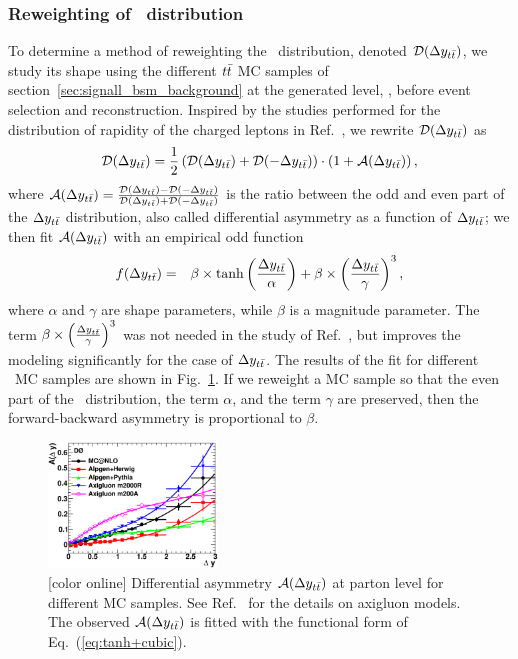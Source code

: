 \documentclass[aps,prd,twocolumn,showpacs,superscriptaddress,groupedaddress,floatfix]{revtex4}
\begin{document}
\subsubsection{Reweighting of \dyttbar\ distribution}
\label{subsec:rewFunction_dy}
To determine a method of reweighting the \dyttbar\ distribution,
denoted ${\cal D}(\Delta y_{t\bar{t}}) $,
we study
its shape using the different $t\bar{t}$ MC samples of
section~\ref{sec:signall_bsm_background}
at the generated level, \ie, before event selection and reconstruction.
Inspired by the studies performed for the distribution of rapidity of the charged leptons in  Ref.~\cite{AFB_form_discussion},
we rewrite ${\cal D}(\Delta y_{t\bar{t}}) $ as
\begin{equation}
 {\cal D}(\Delta y_{t\bar{t}})=\frac 1 2 \left( {\cal D}(\Delta y_{t\bar{t}})+ {\cal D}(-\Delta y_{t\bar{t}})\right)\cdot \left(1+   {\cal A}(\Delta y_{t\bar{t}}) \right),
\end{equation}
where ${\cal A}(\Delta y_{t\bar{t}})=\frac{ {\cal D}(\Delta y_{t\bar{t}})- {\cal D}(-\Delta y_{t\bar{t}}) } { {\cal D}(\Delta y_{t\bar{t}})+ {\cal D}(-\Delta y_{t\bar{t}})}$
 is  the ratio between the  odd and even part of the $\Delta y_{t\bar{t}}$ distribution, also called differential asymmetry as a function of
$\Delta y_{t\bar{t}}$;
we then fit $ {\cal A}(\Delta y_{t\bar{t}})$  with 
an empirical odd function
\begin{eqnarray}\label{eq:tanh+cubic}
f(\Delta y_{t\bar{t}})
&=&
 \beta \times \tanh \left( \frac{\Delta y_{t\bar{t}}}{\alpha} \right) +  \beta  \times \left(\frac{\Delta y_{t\bar{t}}}{\gamma}\right)^3,
\end{eqnarray}
where $\alpha$ and $\gamma$ are shape parameters, while $\beta$ is a magnitude
parameter.  
The term $\beta  \times \left(\frac{\Delta y_{t\bar{t}}}{\gamma}\right)^3$ was not needed in the study  of  Ref.~\cite{AFB_form_discussion}, but improves the modeling
significantly for the case of  $\Delta y_{t\bar{t}}$.
The results of the fit for different \ttbar\ MC samples  are shown in Fig.~\ref{fig:fit_DY_tanh+cubic}.
If we reweight a MC sample so that the even part of the \dyttbar\ distribution, the term $\alpha$, and the term $\gamma$ are preserved,
then  the forward-backward asymmetry is proportional to $\beta$.
\begin{figure}[!ht]
\includegraphics[width=0.40\textwidth]{DY_tanh+cubic_asym.eps}
 \caption{\label{fig:fit_DY_tanh+cubic} [color online]
 Differential asymmetry ${\cal A}(\Delta y_{t\bar{t}})$ at parton level for different MC samples. See Ref.~\cite{Carmona:2014gra} for the details on axigluon models.
 The observed  $ {\cal A}(\Delta y_{t\bar{t}})$ is fitted with the functional form of Eq.~(\ref{eq:tanh+cubic}).
}
\end{figure}
\end{document}
